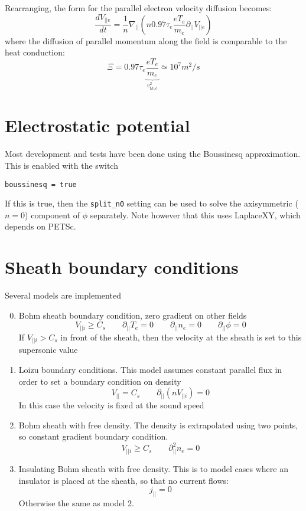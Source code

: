 \documentclass[12pt,a4paper]{article}
\begin{document}
Rearranging, the form for the parallel electron velocity diffusion becomes:
\[
\frac{dV_{||e}}{dt} = \frac{1}{n}\nabla_{||}\left( n 0.97 \tau_e \frac{eT_e}{m_e} \partial_{||} V_{||e}\right)
\]
where the diffusion of parallel momentum along the field is comparable to the heat conduction:
\[
\Xi = 0.97 \tau_e \underbrace{\frac{eT_e}{m_e}}_{v_{th,e}^2} \simeq 10^{7} m^2/s
\]


\section{Electrostatic potential}

Most development and tests have been done using the Boussinesq approximation. This is enabled with the switch
\begin{verbatim}
boussinesq = true
\end{verbatim}
If this is true, then the \texttt{split\_n0} setting can be
used to solve the axisymmetric ($n=0$) component of $\phi$ separately. Note however that this uses LaplaceXY, which depends on PETSc.

\section{Sheath boundary conditions}

Several models are implemented
\begin{enumerate}
  \setcounter{enumi}{-1}  %
\item Bohm sheath boundary condition, zero gradient on other fields
  \[
  V_{||i} \ge C_s \qquad \partial_{||}T_e = 0 \qquad \partial_{||}n_e = 0 \qquad \partial_{||}\phi = 0
  \]
  If $V_{||i} > C_s$ in front of the sheath, then the velocity at the sheath is set to this supersonic value
\item Loizu boundary conditions. This model assumes constant parallel flux in order to set a boundary condition on density
  \[
  V_{||} = C_s \qquad \partial_{||}\left(nV_{||i}\right) = 0
  \]
  In this case the velocity is fixed at the sound speed
\item Bohm sheath with free density. The density is extrapolated using two points, so constant gradient boundary condition.
  \[
  V_{||i} \ge C_s \qquad \partial_{||}^2n_e = 0
  \]
\item Insulating Bohm sheath with free density. This is to model cases where an insulator is placed at the sheath, so
  that no current flows:
  \[
  j_{||} = 0
  \]
  Otherwise the same as model 2.
\end{enumerate}
\end{document}
